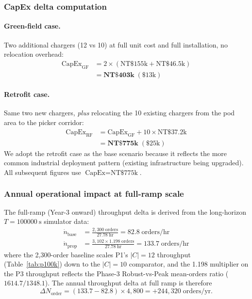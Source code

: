 \documentclass[conference]{IEEEtran}
\begin{document}
\subsubsection{CapEx delta computation}

\paragraph{Green-field case.}
Two additional chargers (12 vs 10) at full unit cost and full installation, no relocation overhead:
\begin{equation}
\begin{aligned}
\text{CapEx}_\text{GF} &= 2 \times (\text{NT\$}155\text{k} + \text{NT\$}46.5\text{k}) \\
&= \mathbf{NT\$403\text{k}}\;(\$13\text{k})
\end{aligned}
\end{equation}

\paragraph{Retrofit case.}
Same two new chargers, \emph{plus} relocating the 10 existing chargers from the pod area to the picker corridor:
\begin{equation}
\begin{aligned}
\text{CapEx}_\text{RF} &= \text{CapEx}_\text{GF} + 10 \times \text{NT\$}37.2\text{k} \\
&= \mathbf{NT\$775\text{k}}\;(\$25\text{k})
\end{aligned}
\end{equation}
We adopt the retrofit case as the base scenario because it reflects the more common industrial deployment pattern (existing infrastructure being upgraded). All subsequent figures use $\text{CapEx} = \text{NT\$775k}$.

\subsubsection{Annual operational impact at full-ramp scale}

The full-ramp (Year-3 onward) throughput delta is derived from the long-horizon $T = \SI{100000}{\second}$ simulator data:
\begin{align}
\dot{n}_\text{base} &= \frac{2{,}300\;\text{orders}}{27.78\;\text{hr}} = 82.8\;\text{orders/hr} \\
\dot{n}_\text{prop} &= \frac{3{,}102 \times 1.198\;\text{orders}}{27.78\;\text{hr}} = 133.7\;\text{orders/hr}
\end{align}
where the 2{,}300-order baseline scales P1's $|C|=12$ throughput (Table~\ref{tab:p100k}) down to the $|C|=10$ comparator, and the 1.198 multiplier on the P3 throughput reflects the Phase-3 Robust-vs-Peak mean-orders ratio ($1614.7/1348.1$). The annual throughput delta at full ramp is therefore
\begin{equation}
\Delta N_\text{order} = (133.7 - 82.8) \times 4{,}800 = +244{,}320\;\text{orders/yr}.
\end{equation}
\end{document}

